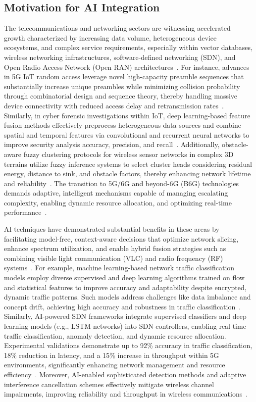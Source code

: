 \documentclass[sigconf]{acmart}
\begin{document}
\subsection{Motivation for AI Integration}

The telecommunications and networking sectors are witnessing accelerated growth characterized by increasing data volume, heterogeneous device ecosystems, and complex service requirements, especially within vector databases, wireless networking infrastructures, software-defined networking (SDN), and Open Radio Access Network (Open RAN) architectures~\cite{ref21,ref22,ref23}. For instance, advances in 5G IoT random access leverage novel high-capacity preamble sequences that substantially increase unique preambles while minimizing collision probability through combinatorial design and sequence theory, thereby handling massive device connectivity with reduced access delay and retransmission rates~\cite{ref21}. Similarly, in cyber forensic investigations within IoT, deep learning-based feature fusion methods effectively preprocess heterogeneous data sources and combine spatial and temporal features via convolutional and recurrent neural networks to improve security analysis accuracy, precision, and recall~\cite{ref22}. Additionally, obstacle-aware fuzzy clustering protocols for wireless sensor networks in complex 3D terrains utilize fuzzy inference systems to select cluster heads considering residual energy, distance to sink, and obstacle factors, thereby enhancing network lifetime and reliability~\cite{ref23}. The transition to 5G/6G and beyond-6G (B6G) technologies demands adaptive, intelligent mechanisms capable of managing escalating complexity, enabling dynamic resource allocation, and optimizing real-time performance~\cite{ref24,ref25}. 

AI techniques have demonstrated substantial benefits in these areas by facilitating model-free, context-aware decisions that optimize network slicing, enhance spectrum utilization, and enable hybrid fusion strategies such as combining visible light communication (VLC) and radio frequency (RF) systems~\cite{ref51,ref52}. For example, machine learning-based network traffic classification models employ diverse supervised and deep learning algorithms trained on flow and statistical features to improve accuracy and adaptability despite encrypted, dynamic traffic patterns. Such models address challenges like data imbalance and concept drift, achieving high accuracy and robustness in traffic classification~\cite{ref51}. Similarly, AI-powered SDN frameworks integrate supervised classifiers and deep learning models (e.g., LSTM networks) into SDN controllers, enabling real-time traffic classification, anomaly detection, and dynamic resource allocation. Experimental validations demonstrate up to 92\% accuracy in traffic classification, 18\% reduction in latency, and a 15\% increase in throughput within 5G environments, significantly enhancing network management and resource efficiency~\cite{ref52}. Moreover, AI-enabled sophisticated detection methods and adaptive interference cancellation schemes effectively mitigate wireless channel impairments, improving reliability and throughput in wireless communications~\cite{ref54,ref55}. 
\end{document}
